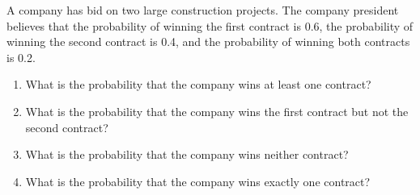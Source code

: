\begin{example}
    A company has bid on two large construction projects. The company president believes that the probability of winning the first contract is 0.6, the probability of winning the second contract is 0.4, and the probability of winning both contracts is 0.2.

    \begin{enumerate}[label=(\alph*)]
        \item What is the probability that the company wins at least one contract?
        \item What is the probability that the company wins the first contract but not the second contract?
        \item What is the probability that the company wins neither contract?
        \item What is the probability that the company wins exactly one contract?
    \end{enumerate}
\end{example}

